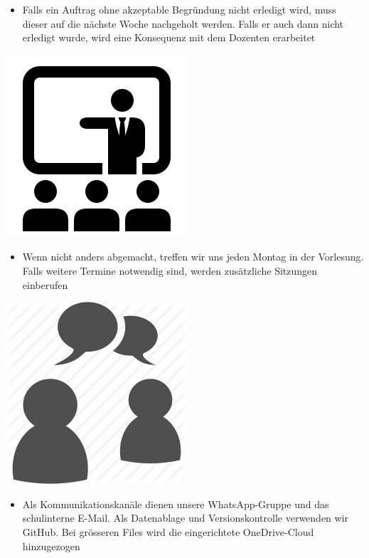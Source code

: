 \begin{itemize}
\item Falls ein Auftrag ohne akzeptable Begründung nicht erledigt wird, muss dieser auf die nächste Woche nachgeholt werden. Falls er auch dann nicht erledigt wurde, wird eine Konsequenz mit dem Dozenten erarbeitet
\end{itemize}

\begin{center}
\includegraphics[scale=0.3]{img/lecture}\\
\end{center}

\begin{itemize}
\item Wenn nicht anders abgemacht, treffen wir uns jeden Montag in der Vorlesung. Falls weitere Termine notwendig sind, werden zusätzliche Sitzungen einberufen \\
\end{itemize}

\begin{center}
\includegraphics[scale=0.25]{img/communication}\\
\end{center}

\begin{itemize}
\item Als Kommunikationskanäle dienen unsere WhatsApp-Gruppe und das schulinterne E-Mail. Als Datenablage und Versionskontrolle verwenden wir GitHub. Bei grösseren Files wird die eingerichtete OneDrive-Cloud hinzugezogen\\\\
\end{itemize}


